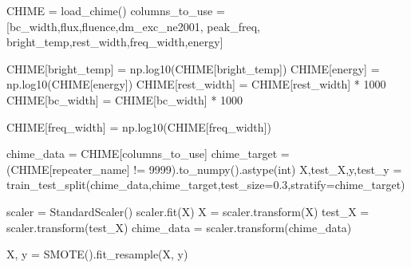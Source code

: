\documentclass[
  letterpaper,
  DIV=11,
  numbers=noendperiod]{scrartcl}
\newenvironment{Shaded}{\begin{snugshade}}{\end{snugshade}}
\newcommand{\DecValTok}[1]{\textcolor[rgb]{0.68,0.00,0.00}{#1}}
\newcommand{\FloatTok}[1]{\textcolor[rgb]{0.68,0.00,0.00}{#1}}
\newcommand{\NormalTok}[1]{\textcolor[rgb]{0.00,0.23,0.31}{#1}}
\newcommand{\OperatorTok}[1]{\textcolor[rgb]{0.37,0.37,0.37}{#1}}
\newcommand{\StringTok}[1]{\textcolor[rgb]{0.13,0.47,0.30}{#1}}
\begin{document}
\begin{Shaded}
\begin{Highlighting}[]
\NormalTok{CHIME }\OperatorTok{=}\NormalTok{ load\_chime()}
\NormalTok{columns\_to\_use }\OperatorTok{=}\NormalTok{ [}\StringTok{\textquotesingle{}bc\_width\textquotesingle{}}\NormalTok{,}\StringTok{\textquotesingle{}flux\textquotesingle{}}\NormalTok{,}\StringTok{\textquotesingle{}fluence\textquotesingle{}}\NormalTok{,}\StringTok{\textquotesingle{}dm\_exc\_ne2001\textquotesingle{}}\NormalTok{,}
                  \StringTok{\textquotesingle{}peak\_freq\textquotesingle{}}\NormalTok{,}
                  \StringTok{\textquotesingle{}bright\_temp\textquotesingle{}}\NormalTok{,}\StringTok{\textquotesingle{}rest\_width\textquotesingle{}}\NormalTok{,}\StringTok{\textquotesingle{}freq\_width\textquotesingle{}}\NormalTok{,}\StringTok{\textquotesingle{}energy\textquotesingle{}}\NormalTok{]}

\NormalTok{CHIME[}\StringTok{\textquotesingle{}bright\_temp\textquotesingle{}}\NormalTok{] }\OperatorTok{=}\NormalTok{ np.log10(CHIME[}\StringTok{\textquotesingle{}bright\_temp\textquotesingle{}}\NormalTok{])}
\NormalTok{CHIME[}\StringTok{\textquotesingle{}energy\textquotesingle{}}\NormalTok{] }\OperatorTok{=}\NormalTok{ np.log10(CHIME[}\StringTok{\textquotesingle{}energy\textquotesingle{}}\NormalTok{])}
\NormalTok{CHIME[}\StringTok{\textquotesingle{}rest\_width\textquotesingle{}}\NormalTok{] }\OperatorTok{=}\NormalTok{ CHIME[}\StringTok{\textquotesingle{}rest\_width\textquotesingle{}}\NormalTok{] }\OperatorTok{*} \DecValTok{1000}
\NormalTok{CHIME[}\StringTok{\textquotesingle{}bc\_width\textquotesingle{}}\NormalTok{] }\OperatorTok{=}\NormalTok{ CHIME[}\StringTok{\textquotesingle{}bc\_width\textquotesingle{}}\NormalTok{] }\OperatorTok{*} \DecValTok{1000}

\NormalTok{CHIME[}\StringTok{\textquotesingle{}freq\_width\textquotesingle{}}\NormalTok{] }\OperatorTok{=}\NormalTok{ np.log10(CHIME[}\StringTok{\textquotesingle{}freq\_width\textquotesingle{}}\NormalTok{])}

\NormalTok{chime\_data }\OperatorTok{=}\NormalTok{ CHIME[columns\_to\_use]}
\NormalTok{chime\_target }\OperatorTok{=}\NormalTok{ (CHIME[}\StringTok{\textquotesingle{}repeater\_name\textquotesingle{}}\NormalTok{] }\OperatorTok{!=} \StringTok{\textquotesingle{}{-}9999\textquotesingle{}}\NormalTok{).to\_numpy().astype(}\StringTok{\textquotesingle{}int\textquotesingle{}}\NormalTok{)}
\NormalTok{X,test\_X,y,test\_y }\OperatorTok{=}\NormalTok{ train\_test\_split(chime\_data,chime\_target,test\_size}\OperatorTok{=}\FloatTok{0.3}\NormalTok{,stratify}\OperatorTok{=}\NormalTok{chime\_target)}

\NormalTok{scaler }\OperatorTok{=}\NormalTok{ StandardScaler()}
\NormalTok{scaler.fit(X)  }
\NormalTok{X }\OperatorTok{=}\NormalTok{ scaler.transform(X)  }
\NormalTok{test\_X }\OperatorTok{=}\NormalTok{ scaler.transform(test\_X)}
\NormalTok{chime\_data }\OperatorTok{=}\NormalTok{ scaler.transform(chime\_data)}

\NormalTok{X, y }\OperatorTok{=}\NormalTok{ SMOTE().fit\_resample(X, y)}
\end{Highlighting}
\end{Shaded}
\end{document}
